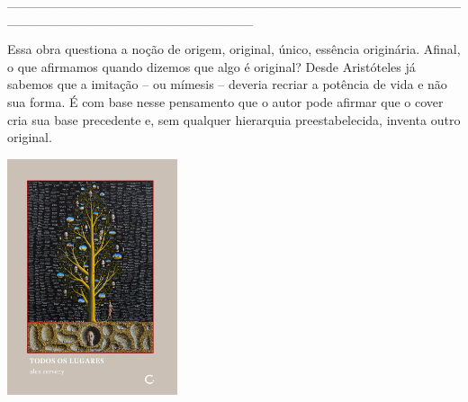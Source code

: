 \hspace*{-2cm}\_\_\_\_\_\_\_\_\_\_\_\_\_\_\_\_\_\_\_\_\_\_\_\_\_\_\_\_\_\_\_\_\_\_\_\_\_\_\_\_\_\_\_\_\_\_\_\_\_\_\_\_\_\_\_\_\_\_\_\_\_\_\_\_\_\_\_\_\_\_\_\_\_\_

\medskip

\noindent{}Essa obra questiona a noção de origem, original, único, essência originária. Afinal, o que afirmamos quando dizemos que algo é original? Desde Aristóteles já sabemos que a imitação – ou mímesis – deveria recriar a potência de vida e não sua forma. É com base nesse pensamento que o autor pode afirmar que o cover cria {} sua base precedente e, sem qualquer hierarquia preestabelecida, inventa outro original.

\vfill

\hspace*{-.4cm}\begin{minipage}[c]{0.90\linewidth}
\small{
{}}
\end{minipage}

\pagebreak

\hspace{.5cm}

\begin{center}
\hspace*{-.5cm}\includegraphics[width=50mm]{./imgs/lugares.jpg}
\end{center}

